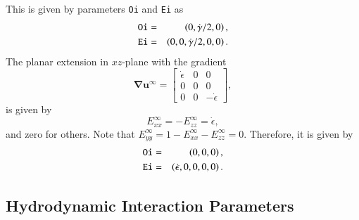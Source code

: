 \documentclass{book}
\begin{document}
This is given by parameters {\tt Oi} and {\tt Ei} as 
\begin{eqnarray}
  {\tt Oi}
  &=&
  \left(0, \dot{\gamma}/2, 0\right),\\
  {\tt Ei}
  &=&
  \left(
    0,
    0,
    \dot{\gamma}/2,
    0,
    0
  \right)
  .
\end{eqnarray}
The planar extension in $xz$-plane with the gradient 
\begin{equation}
  \bm{\nabla}\bm{u}^{\infty}
  =
  \left[
    \begin{array}{ccc}
      \dot{\epsilon} & 0 & 0 \\
      0 & 0 & 0 \\
      0 & 0 & -\dot{\epsilon}
    \end{array}
  \right]
  ,
\end{equation}
is given by 
\begin{equation}
  E^{\infty}_{xx} = -E^{\infty}_{zz} = \dot{\epsilon},
\end{equation}
and zero for others. Note that 
$E^{\infty}_{yy} = 1-E^{\infty}_{xx}-E^{\infty}_{zz} = 0$. 
Therefore, it is given by 
\begin{eqnarray}
  {\tt Oi}
  &=&
  \left(0, 0, 0\right),\\
  {\tt Ei}
  &=&
  \left(
    \dot{\epsilon},
    0,
    0,
    0,
    0
  \right)
  .
\end{eqnarray}

\subsection{Hydrodynamic Interaction Parameters}
\end{document}

